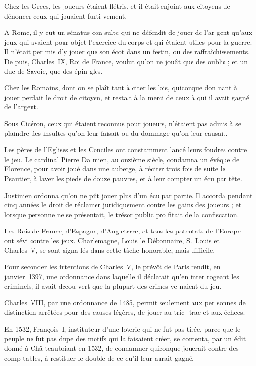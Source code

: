 Chez les Grecs, les joueurs étaient
flétris, et il était enjoint aux citoyens
de dénoncer ceux qui jouaient furti%
vement.

A Rome, il y eut un sénatus-con
sulte qui ne défendit de jouer de l'ar%
gent qu'aux jeux qui avaient pour
objet l'exercice du corps et qui étaient
utiles pour la guerre. Il n'était per%
mis d'y jouer que son écot dans un
festin, ou des raffraîchissements. De%
puis, Charles~IX, Roi de France,
voulut qu'on ne jouât que des oublis ;
et un duc de Savoie, que des épin%
gles.

Chez les Romains, dont on se plaît
tant à citer les lois, quiconque don%
nant à jouer perdait le droit de citoyen,
et restait à la merci de ceux à qui il
avait gagné de l'argent.

Sous Cicéron, ceux qui étaient
reconnus pour joueurs, n'étaient pas
admis à se plaindre des insultes qu'on
leur faisait ou du dommage qu'on leur
causait.

Les pères de l'Eglises et les Conciles
ont constamment lancé leurs foudres
contre le jeu. Le cardinal Pierre Da%
mien, au onzième siècle, condamna
un évêque de Florence, pour avoir
joué dans une auberge, à réciter
trois fois de suite le Psautier, à laver
les pieds de douze pauvres, et à leur
compter un écu par tête.

Justinien ordonna qu'on ne pût
jouer plus d'un écu par partie. Il
accorda pendant cinq années le droit
de réclamer juridiquement contre les
gains des joueurs ; et lorsque personne
ne se présentait, le trésor public pro%
fitait de la confiscation.

Les Rois de France, d'Espagne,
d'Angleterre, et tous les potentats
de l'Europe ont sévi contre les jeux.
Charlemagne, Louis le Débonnaire,
S.~Louis et Charles~V, se sont signa%
lés dans cette tâche honorable, mais
difficile.

Pour seconder les intentions de
Charles~V, le prévôt de Paris rendit,
en janvier~1397, une ordonnance
dans laquelle il déclarait qu'en inter%
rogeant les criminels, il avait décou%
vert que la plupart des crimes ve%
naient du jeu.

Charles~VIII, par une ordonnance
de 1485, permit seulement aux per%
sonnes de distinction arrêtées pour
des causes légères, de jouer au tric-
trac et aux échecs.

En 1532, François~I\ier, instituteur
d'une loterie qui ne fut pas tirée,
parce que le peuple ne fut pas dupe
des motifs qui la faisaient créer, se
contenta, par un édit donné à Châ%
teaubriant en 1532, de condamner
quiconque jouerait contre des comp%
tables, à restituer le double de ce
qu'il leur aurait gagné.

